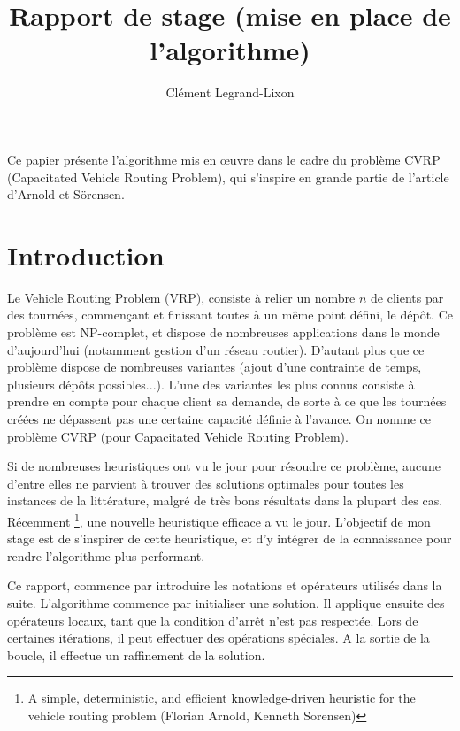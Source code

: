 \documentclass[a4paper,11pt]{article}%
\begin{document}
\title{Rapport de stage (mise en place de l'algorithme)}

\author{Clément Legrand-Lixon}

\date{}

\maketitle

Ce papier présente l'algorithme mis en œuvre dans le cadre du problème CVRP (Capacitated Vehicle Routing Problem), qui s'inspire en grande partie de l'article d'Arnold et Sörensen. 

\section*{Introduction}
Le Vehicle Routing Problem (VRP), consiste à relier un nombre $n$ de clients par des tournées, commençant et finissant toutes à un même point défini, le dépôt. Ce problème est NP-complet, et dispose de nombreuses applications dans le monde d'aujourd'hui (notamment gestion d'un réseau routier). D'autant plus que ce problème dispose de nombreuses variantes (ajout d'une contrainte de temps, plusieurs dépôts possibles...). L'une des variantes les plus connus consiste à prendre en compte pour chaque client sa demande, de sorte à ce que les tournées créées ne dépassent pas une certaine capacité définie à l'avance. On nomme ce problème CVRP (pour Capacitated Vehicle Routing Problem). 

Si de nombreuses heuristiques ont vu le jour pour résoudre ce problème, aucune d'entre elles ne parvient à trouver des solutions optimales pour toutes les instances de la littérature, malgré de très bons résultats dans la plupart des cas. Récemment \footnote{A simple, deterministic, and efficient knowledge-driven heuristic
for the vehicle routing problem (Florian Arnold, Kenneth Sorensen)}, une nouvelle heuristique efficace a vu le jour. L'objectif de mon stage est de s'inspirer de cette heuristique, et d'y intégrer de la connaissance pour rendre l'algorithme plus performant.

Ce rapport, commence par introduire les notations et opérateurs utilisés dans la suite.   
L'algorithme commence par initialiser une solution. Il applique ensuite des opérateurs locaux, tant que la condition d'arrêt n'est pas respectée. Lors de certaines itérations, il peut effectuer des opérations spéciales. A la sortie de la boucle, il effectue un raffinement de la solution.
\end{document}
